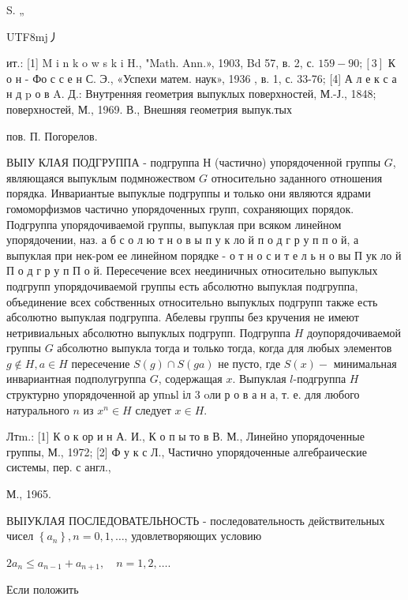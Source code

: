 \documentclass[10pt]{article}
\begin{document}
S. „\begin{CJK}{UTF8}{mj}丿\end{CJK}ит.: [1] M i n k o w s k i H., "Math. Ann.», 1903, Bd 57, в. 2, с. $159-90 ;[3]$ К о н - Фо с с е н С. Э., «Успехи матем. наук», 1936 , в. 1, с. 33-76; [4] А л е к с а н д p о в A. Д.: Внутренняя геометрия выпуклых поверхностей, М.-Ј., 1848; поверхностей, М., 1969. В., Внешняя геометрия выпук.тых

пов. П. Погорелов.



ВЫІУ КЛАЯ ПОДГРУППА - подгруппа Н (частично) упорядоченной группы $G$, являющаяся выпуклым подмножеством $G$ относительно заданного отношения порядка. Инвариантые выпуклые подгруппы и только они являются ядрами гомоморфизмов частично упорядоченных групп, сохраняющих порядок. Подгруппа упорядочиваемой группы, выпуклая при всяком линейном упорядочении, наз. а б с о л ю т н о в ы п у к ло й п о д г р у п п о й, а выпуклая при нек-ром ее линейном порядке - о т н о с и т е л ь н о вы П ук ло й П о д г р у п П о й. Пересечение всех неединичных относительно выпуклых подгрупп упорядочиваемой группы есть абсолютно выпуклая подгруппа, объединение всех собственных относительно выпуклых подгрупп также есть абсолютно выпуклая подгруппа. Абелевы группы без кручения не имеют нетривиальных абсолютно выпуклых подгрупп. Подгруппа $H$ доупорядочиваемой группы $G$ абсолютно выпукла тогда и только тогда, когда для любых элементов $g \notin H, a \in H$ пересечение $S(g) \cap S(g a)$ не пусто, где $S(x)-$ минимальная инвариантная подполугруппа $G$, содержащая $x$. Выпуклая $l$-подгруппа $H$ структурно упорядоченной ар упnьl іл 3 oли р о в а н а, т. е. для любого натурального $n$ из $x^{n} \in H$ следует $x \in H$.



Лтm.: [1] К о к ор и н А. И., К о п ы то в В. М., Линейно упорядоченные группы, М., 1972; [2] Ф у к с Л., Частично упорядоченные алгебраические системы, пер. с англ.,

М., 1965.



ВЫІУКЛАЯ ПОСЛЕДОВАТЕЛЬНОСТЬ - последовательность действительных чисел $\left\{a_{n}\right\}, n=0,1, \ldots$, удовлетворяющих условию



$2 a_{n} \leqslant a_{n-1}+a_{n+1}, \quad n=1,2, \ldots$.



Если положить
\end{document}
